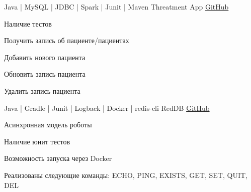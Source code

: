 

\begin{cventries}

  \cventry
    {Java | MySQL | JDBC | Spark | Junit | Maven} %
    {Threatment App} %
    {\href{https://github.com/MasoNord/threatment-app}{GitHub}} %
    {} %
    {
      \begin{cvitems} %
        \item {Наличие тестов}
        \item {Получить запись об пациенте/пациентах}
        \item {Добавить нового пациента}
        \item {Обновить запись пациента}
        \item {Удалить запись пациента}
      \end{cvitems}
    }

  \cventry
    {Java | Gradle | Junit | Logback | Docker | redis-cli} %
    {RedDB} %
    {\href{https://github.com/MasoNord/redDB}{GitHub}} %
    {} %
    {
      \begin{cvitems} %
        \item {Асинхронная модель роботы}
        \item {Наличие юнит тестов}
        \item {Возможность запуска через Docker}
        \item {Реализованы следующие команды: ECHO, PING, EXISTS, GET, SET, QUIT, DEL}
      \end{cvitems}
    }


\end{cventries}
